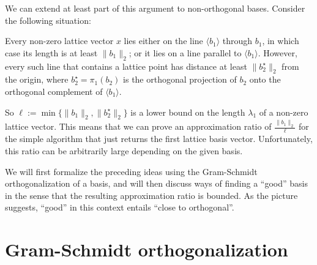 We can extend at least part of this argument to non-orthogonal bases.
Consider the following situation:
\begin{center}
\end{center}
Every non-zero lattice vector $x$ lies either on the line $\langle b_1 \rangle$ through $b_1$,
in which case its length is at least $\|b_1\|_2$;
or it lies on a line parallel to $\langle b_1 \rangle$.
However, every such line that contains a lattice point has distance at least $\|b_2^\star\|_2$
from the origin, where $b_2^\star = \pi_1(b_2)$ is the orthogonal projection of $b_2$
onto the orthogonal complement of $\langle b_1 \rangle$.

So $\ell := \min\{\|b_1\|_2, \|b_2^\star\|_2\}$ is a lower bound on the length $\lambda_1$
of a non-zero lattice vector.
This means that we can prove an approximation ratio of $\frac{\|b_1\|_2}{\ell}$
for the simple algorithm that just returns the first lattice basis vector.
Unfortunately, this ratio can be arbitrarily large depending on the given basis.

We will first formalize the preceding ideas using the Gram-Schmidt orthogonalization of a basis,
and will then discuss ways of finding a ``good'' basis in the sense that the resulting approximation ratio
is bounded. As the picture suggests, ``good'' in this context entails ``close to orthogonal''.



\section{Gram-Schmidt orthogonalization}

